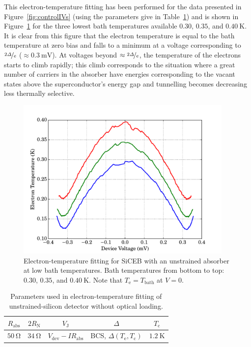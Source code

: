 \par 
This electron-temperature fitting has been performed for the data presented in Figure~\ref{fig:controlIVs} (using the parameters give in Table~\ref{tab:ControlTeParams_dark}) and is shown in Figure~\ref{fig:controlTe} for the three lowest bath temperatures available $0.30$, $0.35$, and $0.40~\mathrm{K}$. It is clear from this figure that the electron temperature is equal to the bath temperature at zero bias and falls to a minimum at a voltage corresponding to $\nicefrac{2\varDelta}{e}$ ($\approx 0.3~\mathrm{mV}$). At voltages beyond $\approx \nicefrac{2\varDelta}{e}$, the temperature of the electrons starts to climb rapidly; this climb corresponds to the situation where a great number of carriers in the absorber have energies corresponding to the vacant states above the superconductor's energy gap and tunnelling becomes decreasing less thermally selective.
\begin{figure}[tb]
\begin{center}
\includegraphics[width = 0.95\textwidth]{figures/control_Te}
\caption[Electron-temperature fitting for SiCEB with an unstrained absorber]{Electron-temperature fitting for SiCEB with an unstrained absorber at low bath temperatures. Bath temperatures from bottom to top: $0.30$, $0.35$, and $0.40~\mathrm{K}$. Note that $T_{\mathrm{e}} = T_{\mathrm{bath}}$ at $V = 0$.}
\label{fig:controlTe}
\end{center}
\end{figure}
\begin{table}[htb]
\caption[Parameters used in electron-temperature fitting of unstrained-silicon detector with optical loading]{Parameters used in electron-temperature fitting of unstrained-silicon detector without optical loading.} 
\label{tab:ControlTeParams_dark}
\centering
\begin{tabular}{ccccc}
\toprule\toprule
$R_{\mathrm{abs}}$ & $2R_{\mathrm{N}}$ & $V_{\mathrm{J}}$ & $\varDelta$ & $T_{\mathrm{c}}$ \\ \midrule
$50~\mathrm{\Omega}$ & $34~\mathrm{\Omega}$ & $V_{\mathrm{dev}} - IR_{\mathrm{abs}}$ 
& BCS, $\varDelta\left(T_{\mathrm{e}},T_{\mathrm{c}}\right)$ & $1.2~\mathrm{K}$ \\
\bottomrule
\end{tabular}
\end{table}
%
